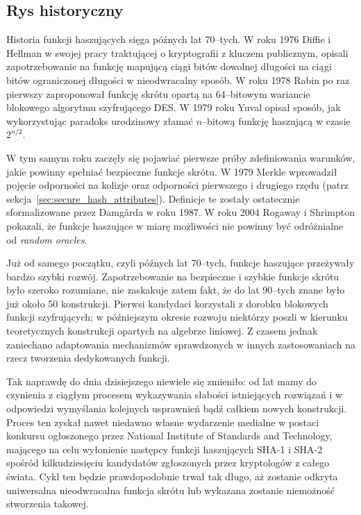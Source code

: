 \documentclass[12pt,a4paper,twoside]{article}
\begin{document}
\subsection{Rys historyczny}
Historia funkcji haszujących sięga późnych lat 70--tych. W roku 1976 Diffie i
Hellman w swojej pracy traktującej o kryptografii z kluczem publicznym, opisali
zapotrzebowanie na funkcję mapującą ciągi bitów dowolnej długości na ciągi
bitów ograniczonej długości w nieodwracalny sposób. W roku 1978 Rabin po raz
pierwszy zaproponował funkcję skrótu opartą na 64--bitowym wariancie blokowego
algorytmu szyfrującego DES. W 1979 roku Yuval opisał sposób, jak wykorzystując
paradoks urodzinowy złamać $n$--bitową funkcję haszującą w czasie $2^{n/2}$.

W tym samym roku zaczęły się pojawiać pierwsze próby zdefiniowania warunków,
jakie powinny spełniać bezpieczne funkcje skrótu. W 1979 Merkle wprowadził
pojęcie odporności na kolizje oraz odporności pierwszego i drugiego rzędu
(patrz sekcja~\ref{sec:secure_hash_attributes}). Definicje te zostały
ostatecznie sformalizowane przez Damg\r{a}rda w roku 1987. W roku 2004 Rogaway
i Shrimpton pokazali, że funkcje haszujące w miarę możliwości nie powinny być
odróżnialne od \textit{random oracles}.

Już od samego początku, czyli późnych lat 70--tych, funkcje haszujące
przeżywały bardzo szybki rozwój. Zapotrzebowanie na bezpieczne i szybkie
funkcje skrótu było szeroko rozumiane, nie zaskakuje zatem fakt, że do lat
90--tych znane było już około 50 konstrukcji. Pierwsi kandydaci korzystali z
dorobku blokowych funkcji szyfrujących; w późniejszym okresie rozwoju niektórzy
poszli w kierunku teoretycznych konstrukcji opartych na algebrze liniowej. Z
czasem jednak zaniechano adaptowania mechanizmów sprawdzonych w innych
zastosowaniach na rzecz tworzenia dedykowanych funkcji.

Tak naprawdę do dnia dzisiejszego niewiele się zmieniło: od lat
mamy do czynienia z ciągłym procesem wykazywania słabości istniejących
rozwiązań i w odpowiedzi wymyślania kolejnych usprawnień bądź całkiem nowych
konstrukcji. Proces ten zyskał nawet niedawno własne wydarzenie medialne w
postaci konkursu ogłoszonego przez National Institute of Standards and
Technology, mającego na celu wyłonienie następcy funkcji haszujących SHA-1 i
SHA-2 spośród kilkudziesięciu kandydatów zgłoszonych przez kryptologów z całego
świata. Cykl ten będzie prawdopodobnie trwał tak długo, aż zostanie odkryta
uniwersalna nieodwracalna funkcja skrótu lub wykazana zostanie niemożność
stworzenia takowej.
\end{document}
